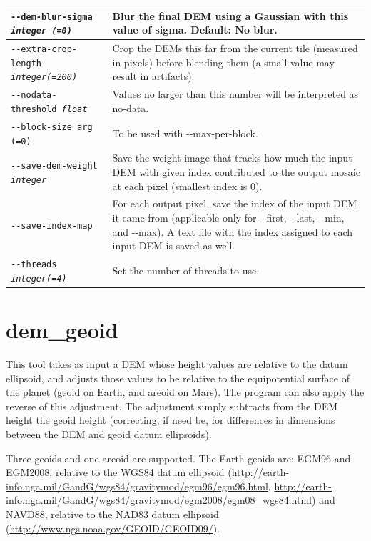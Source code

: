 \begin{longtable}{|l|p{10cm}|}
\texttt{-\/-dem-blur-sigma \textit{integer (=0)} } & Blur the final DEM using a Gaussian with this value of sigma. Default: No blur. \\ \hline

\texttt{-\/-extra-crop-length \textit{integer(=200)}} &
Crop the DEMs this far from the current tile (measured in pixels) before blending them (a small value may result in artifacts).
\\ \hline

\texttt{-\/-nodata-threshold \textit{float}} & Values no larger than this number will be interpreted as no-data.\\ \hline

\texttt{-\/-block-size arg (=0)} & To be used with -\/-max-per-block.\\ \hline

\texttt{-\/-save-dem-weight \textit{integer}} &
Save the weight image that tracks how much the input DEM with given index contributed to the output mosaic at each pixel (smallest index is 0).\\ \hline

\texttt{-\/-save-index-map} &
For each output pixel, save the index of the input DEM it came from
(applicable only for -\/-first, -\/-last, -\/-min, and -\/-max). A text
file with the index assigned to each input DEM is saved as well.\\ \hline

\texttt{-\/-threads \textit{integer(=4)}}
& Set the number of threads to use. \\ \hline
\end{longtable}

\clearpage

\section{dem\_geoid}
\label{demgeoid}

This tool takes as input a \ac{DEM} whose height values are relative to the
datum ellipsoid, and adjusts those values to be relative to the
equipotential surface of the planet (geoid on Earth, and areoid on
Mars). The program can also apply the reverse of this adjustment. The
adjustment simply subtracts from the DEM height the geoid height
(correcting, if need be, for differences in dimensions between the DEM
and geoid datum ellipsoids).

Three geoids and one areoid are supported. The Earth geoids are: EGM96
and EGM2008, relative to the WGS84 datum ellipsoid
(\url{http://earth-info.nga.mil/GandG/wgs84/gravitymod/egm96/egm96.html},
\url{http://earth-info.nga.mil/GandG/wgs84/gravitymod/egm2008/egm08_wgs84.html})
and NAVD88, relative to the NAD83 datum ellipsoid
(\url{http://www.ngs.noaa.gov/GEOID/GEOID09/}).

